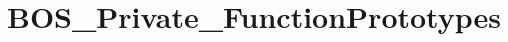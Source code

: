 \hypertarget{group___b_o_s___private___function_prototypes}{}\section{B\+O\+S\+\_\+\+Private\+\_\+\+Function\+Prototypes}
\label{group___b_o_s___private___function_prototypes}
